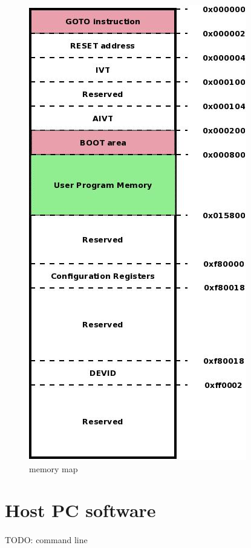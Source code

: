 \documentclass[a4paper, 11pt]{article}
\begin{document}
\begin{figure}[]
\centering
\includegraphics[scale=0.4]{./dia/memory_map/main.jpeg}
\caption{memory map}
\label{memory_map}
\end{figure}


\newpage
\section{Host PC software}
\paragraph{}
TODO: command line
\end{document}
